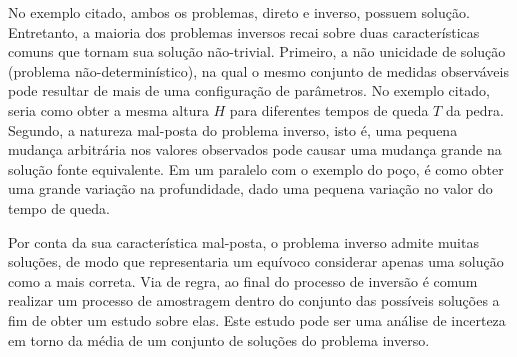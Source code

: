 No exemplo citado, ambos os problemas, direto e inverso, possuem solução. Entretanto,
a maioria dos problemas inversos recai sobre duas características
comuns que tornam sua solução não-trivial. Primeiro, a não unicidade de solução
(problema não-determinístico), na qual o mesmo conjunto de medidas
observáveis pode resultar de mais de uma configuração de parâmetros. No exemplo
citado, seria como obter a mesma altura $H$ para diferentes tempos
de queda $T$ da pedra. Segundo, a natureza mal-posta do problema inverso, isto é,
uma pequena mudança arbitrária nos valores observados pode causar uma mudança grande
na solução fonte equivalente. Em um paralelo com o exemplo do poço, é como
obter uma grande variação na profundidade, dado uma pequena variação no valor do tempo de queda.

Por conta da sua característica mal-posta, o problema inverso
admite muitas soluções, de modo que representaria um equívoco considerar apenas
uma solução como a mais correta. Via de regra, ao final do processo de inversão é comum
realizar um processo de amostragem dentro do conjunto das possíveis soluções a fim
de obter um estudo sobre elas. Este estudo pode ser uma análise de 
incerteza em torno da média de um conjunto de soluções do problema inverso.

